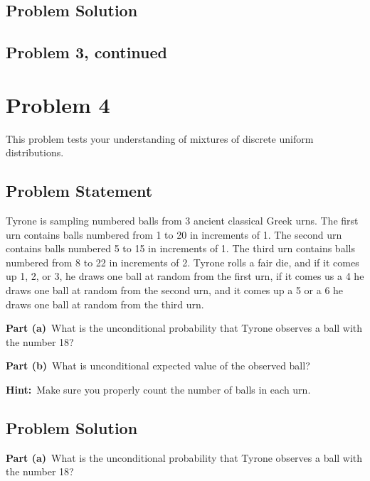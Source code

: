 \documentclass[12pt]{article}
\theoremstyle{definition}
\begin{document}
\subsection*{Problem Solution}


\newpage
\subsection*{Problem 3, continued}





\newpage
\section*{Problem 4}

This problem tests your understanding of mixtures of discrete uniform distributions.

\subsection*{Problem Statement}

Tyrone is sampling numbered balls from 3 ancient classical Greek urns. The first urn contains balls numbered from 1 to 20 in increments of 1. The second urn contains balls numbered 5 to 15 in increments of 1. The third urn contains balls numbered from 8 to 22 in increments of 2. Tyrone rolls a fair die, and if it comes up 1, 2, or 3, he draws one ball at random from the first urn, if it comes us a 4 he draws one ball at random from the second urn, and it comes up a 5 or a 6 he draws one ball at random from the third urn.

\bigskip
\noindent
{\bf Part (a)}\ What is the unconditional probability that Tyrone observes a ball with the number 18?

\bigskip
\noindent
{\bf Part (b)}\ What is unconditional expected value of the observed ball?

\bigskip
\noindent
{\bf Hint:}\ Make sure you properly count the number of balls in each urn.

\subsection*{Problem Solution}

\noindent
{\bf Part (a)}\ What is the unconditional probability that Tyrone observes a ball with the number 18?
\end{document}
